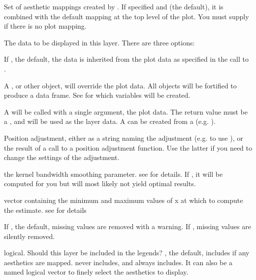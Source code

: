 \documentclass[a4paper]{book}
\begin{document}
\begin{Arguments}
\begin{ldescription}
\item[\code{mapping}] Set of aesthetic mappings created by . If specified and
 (the default), it is combined with the default mapping
at the top level of the plot. You must supply  if there is no plot
mapping.

\item[\code{data}] The data to be displayed in this layer. There are three
options:

If , the default, the data is inherited from the plot
data as specified in the call to .

A , or other object, will override the plot
data. All objects will be fortified to produce a data frame. See
 for which variables will be created.

A  will be called with a single argument,
the plot data. The return value must be a , and
will be used as the layer data. A  can be created
from a  (e.g. ).

\item[\code{position}] Position adjustment, either as a string naming the adjustment
(e.g.  to use ), or the result of a call to a
position adjustment function. Use the latter if you need to change the
settings of the adjustment.

\item[\code{bandwidth}] the kernel bandwidth smoothing parameter. see
 for details. If ,
it will be computed for you but will most likely not yield optimal
results.

\item[\code{range.x}] vector containing the minimum and maximum values of x at which
to compute the estimate. see  for details

\item[\code{na.rm}] If , the default, missing values are removed with
a warning. If , missing values are silently removed.

\item[\code{show.legend}] logical. Should this layer be included in the legends?
, the default, includes if any aesthetics are mapped.
 never includes, and  always includes.
It can also be a named logical vector to finely select the aesthetics to
display.


\end{ldescription}
\end{Arguments}
\end{document}

